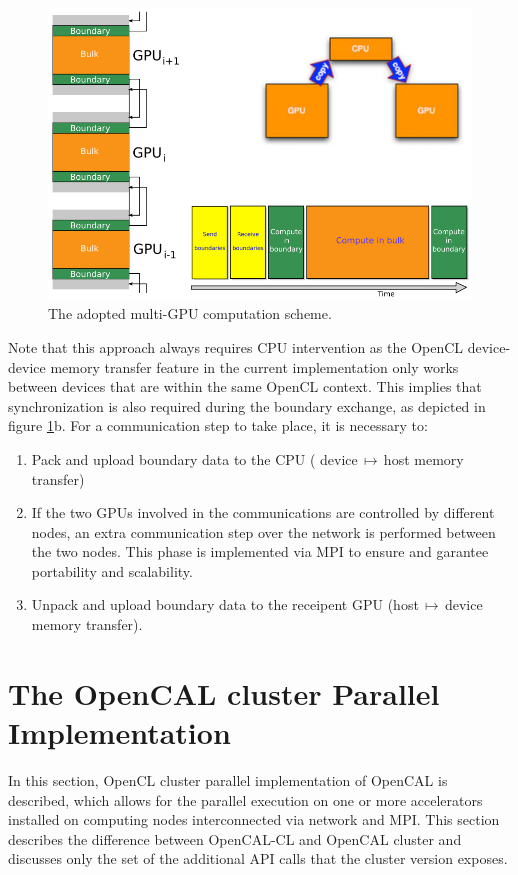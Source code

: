 \begin{figure}
	\centering
		\includegraphics[width=1.0\textwidth]{./images/opencal/multigpu_naive_exchange.png}
		\caption{The adopted multi-GPU computation scheme.}
		\label{fig:multigpu_naive_exchange}
\end{figure}


Note that this approach always requires CPU intervention as the OpenCL device-device memory transfer feature in the current implementation only works between devices that are within the same OpenCL context. This implies that synchronization is also required during the boundary exchange, as depicted in figure \ref{fig:multigpu_naive_exchange}b.
For a communication step to take place, it is necessary to:
\begin{enumerate}
	\item Pack and upload boundary data to the CPU ( device$\,\mapsto\,$host  memory transfer)
	\item If the two GPUs involved in the communications are controlled by different nodes, an extra communication step over the network is performed between the two nodes. This phase is implemented via MPI \cite{mpiStandard:1994} to ensure and garantee portability and scalability. 
	\item Unpack and upload boundary data to the receipent GPU (host$\,\mapsto\,$device memory transfer).
\end{enumerate}


\section{The OpenCAL cluster Parallel Implementation}
\label{sec:opencal_cluster_implementation}
  In this section, OpenCL cluster parallel implementation
of OpenCAL is described, which allows for the parallel execution on one or more accelerators installed on computing nodes interconnected via network and MPI.
This section describes the difference between OpenCAL-CL and OpenCAL cluster and discusses only the set of the additional API calls that the cluster version exposes. 

